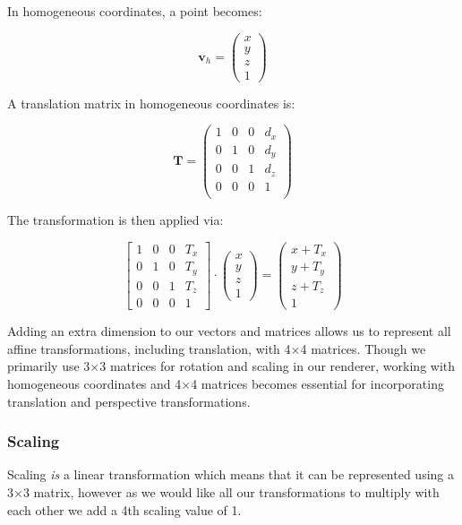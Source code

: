 \documentclass[12pt]{article}
\begin{document}
In homogeneous coordinates, a point becomes:

\[
    \mathbf{v}_h = \begin{pmatrix} x \\ y \\ z \\ 1 \end{pmatrix}
\]

A translation matrix in homogeneous coordinates is:

\[
    \mathbf{T} = \begin{pmatrix}
        1 & 0 & 0 & d_x \\
        0 & 1 & 0 & d_y \\
        0 & 0 & 1 & d_z \\
        0 & 0 & 0 & 1   \\
    \end{pmatrix}
\]

The transformation is then applied via:

\[
    \begin{bmatrix}  1 & 0 & 0 & {T_x} \\ 0 & 1 & 0 & {T_y} \\ 0 & 0 & 1 & {T_z} \\ 0 & 0 & 0 & 1 \end{bmatrix} \cdot \begin{pmatrix} x \\ y \\ z \\ 1 \end{pmatrix} = \begin{pmatrix} x + {T_x} \\ y + {T_y} \\ z + {T_z} \\ 1 \end{pmatrix}
\]

Adding an extra dimension to our vectors and matrices allows us to represent all affine transformations, including translation, with 4$\times$4 matrices. Though we primarily use 3$\times$3 matrices for rotation and scaling in our renderer, working with homogeneous coordinates and 4$\times$4 matrices becomes essential for incorporating translation and perspective transformations.


\subsubsection{Scaling}

Scaling \textit{is} a linear transformation which means that it can be represented using a 3$\times$3 matrix, however as we would like all our transformations to multiply with each other we add a 4th scaling value of 1.
\end{document}
